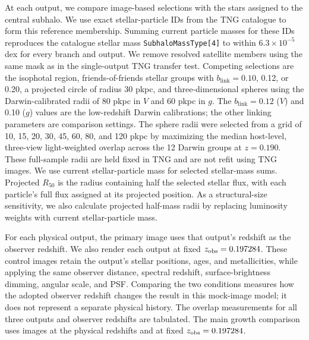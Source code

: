 \documentclass[usenatbib]{mnras}
\begin{document}
At each output, we compare image-based selections with the stars assigned
to the central subhalo. We use exact stellar-particle IDs from the TNG
catalogue to form this reference membership. Summing current particle
masses for these IDs reproduces the catalogue stellar mass
\texttt{SubhaloMassType[4]} to within $6.3\times10^{-5}$ dex for every
branch and output. We remove resolved satellite members using the same
mask as in the single-output TNG transfer test. Competing selections are
the isophotal region, friends-of-friends stellar groups with
$b_{\mathrm{link}}=0.10$, 0.12, or 0.20, a projected circle of radius
30 pkpc, and three-dimensional spheres using the Darwin-calibrated radii
of 80 pkpc in $V$ and 60 pkpc in $g$. The $b_{\mathrm{link}}=0.12$
($V$) and 0.10 ($g$) values are the low-redshift Darwin calibrations;
the other linking parameters are comparison settings. The sphere radii
were selected from a grid of 10, 15, 20, 30, 45, 60, 80, and 120 pkpc
by maximizing the median host-level, three-view light-weighted overlap
across the 12 Darwin groups at $z=0.190$. These full-sample radii are
held fixed in TNG and are not refit using TNG images.
We use current stellar-particle mass for selected stellar-mass sums.
Projected $R_{50}$ is the radius containing half the selected stellar
flux, with each particle's full flux assigned at its projected position.
As a structural-size sensitivity, we also calculate projected half-mass
radii by replacing luminosity weights with current stellar-particle mass.

For each physical output, the primary image uses that output's redshift
as the observer redshift. We also render each output at fixed
$z_{\rm obs}=0.197284$. These control images retain the output's stellar
positions, ages, and metallicities, while applying the same observer
distance, spectral redshift, surface-brightness dimming, angular scale,
and PSF. Comparing the two conditions measures how the adopted observer
redshift changes the result in this mock-image model; it does not
represent a separate physical history. The overlap measurements for all
three outputs and observer redshifts are tabulated. The main growth
comparison uses images at the physical redshifts and at fixed
$z_{\rm obs}=0.197284$.
\end{document}
